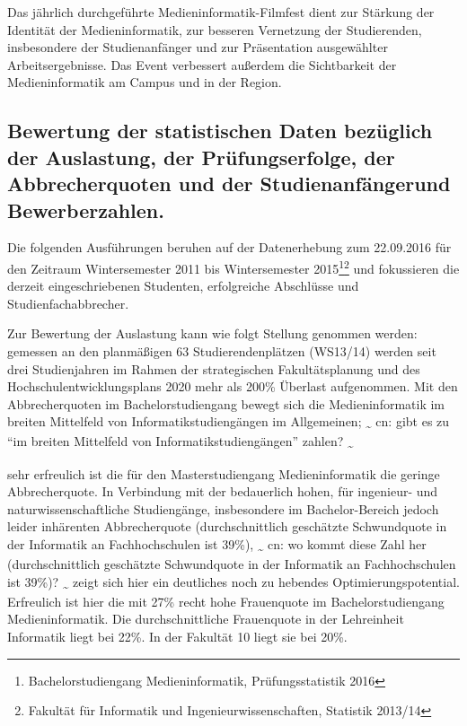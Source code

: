 Das jährlich durchgeführte Medieninformatik-Filmfest dient zur Stärkung
der Identität der Medieninformatik, zur besseren Vernetzung der
Studierenden, insbesondere der Studienanfänger und zur Präsentation
ausgewählter Arbeitsergebnisse. Das Event verbessert außerdem die
Sichtbarkeit der Medieninformatik am Campus und in der Region.

\subsection{Bewertung der statistischen Daten bezüglich der
Auslastung, der Prüfungserfolge, der Abbrecherquoten und der
Studienanfängerund
Bewerberzahlen.}\label{bewertung-der-statistischen-daten-bezuxfcglich-der-auslastung-der-pruxfcfungserfolge-der-abbrecherquoten-und-der-studienanfuxe4ngerund-bewerberzahlen.}

Die folgenden Ausführungen beruhen auf der Datenerhebung zum 22.09.2016
für den Zeitraum Wintersemester 2011 bis Wintersemester 2015\footnote{Bachelorstudiengang
  Medieninformatik, Prüfungsstatistik 2016}\footnote{Fakultät für
  Informatik und Ingenieurwissenschaften, Statistik 2013/14} und
fokussieren die derzeit eingeschriebenen Studenten, erfolgreiche
Abschlüsse und Studienfachabbrecher.

Zur Bewertung der Auslastung kann wie folgt Stellung genommen werden:
gemessen an den planmäßigen 63 Studierendenplätzen (WS13/14) werden seit
drei Studienjahren im Rahmen der strategischen Fakultätsplanung und des
Hochschulentwicklungsplans 2020 mehr als 200\% Überlast aufgenommen. Mit
den Abbrecherquoten im Bachelorstudiengang bewegt sich die
Medieninformatik im breiten Mittelfeld von Informatikstudiengängen im
Allgemeinen; \textsubscript{\textasciitilde{}} cn: gibt es zu ``im
breiten Mittelfeld von Informatikstudiengängen'' zahlen?
\textsubscript{\textasciitilde{}}

sehr erfreulich ist die für den Masterstudiengang Medieninformatik die
geringe Abbrecherquote. In Verbindung mit der bedauerlich hohen, für
ingenieur- und naturwissenschaftliche Studiengänge, insbesondere im
Bachelor-Bereich jedoch leider inhärenten Abbrecherquote
(durchschnittlich geschätzte Schwundquote in der Informatik an
Fachhochschulen ist 39\%), \textsubscript{\textasciitilde{}} cn: wo
kommt diese Zahl her (durchschnittlich geschätzte Schwundquote in der
Informatik an Fachhochschulen ist 39\%)?
\textsubscript{\textasciitilde{}} zeigt sich hier ein deutliches noch zu
hebendes Optimierungspotential. Erfreulich ist hier die mit 27\% recht
hohe Frauenquote im Bachelorstudiengang Medieninformatik. Die
durchschnittliche Frauenquote in der Lehreinheit Informatik liegt bei
22\%. In der Fakultät 10 liegt sie bei 20\%.

